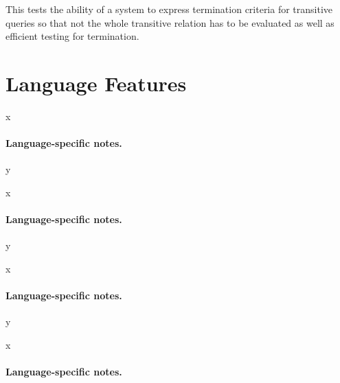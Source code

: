 


This tests the ability of a system to express termination criteria for transitive queries so that not the whole transitive relation has to be evaluated as well as efficient testing for termination.




\section{Language Features}


x

\noindent\paragraph{Language-specific notes.}

y




x

\noindent\paragraph{Language-specific notes.}

y




x

\noindent\paragraph{Language-specific notes.}

y




x

\noindent\paragraph{Language-specific notes.}

